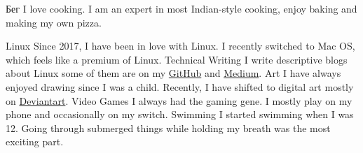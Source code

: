



\begin{cvskills}
  \cvskill
    {Бег} %
    {I love cooking. I am an expert in most Indian-style cooking, enjoy baking and making my own pizza.} %

  \cvskill
    {Linux} %
    {Since 2017, I have been in love with Linux. I recently switched to Mac OS, which feels like a premium of Linux.} %
  \cvskill
    {Technical Writing} %
    {I write descriptive blogs about Linux some of them are on my \href{https://github.com/themagicalmammal/howtodebuntu}{GitHub} and \href{https://medium.com/@d19cyber}{Medium}.} %
  \cvskill
    {Art} %
    {I have always enjoyed drawing since I was a child. Recently, I have shifted to digital art mostly on \href{https://www.deviantart.com/themagicalmammal}{Deviantart}.} %
  \cvskill
    {Video Games} %
    {I always had the gaming gene. I mostly play on my phone and occasionally on my switch.} %
  \cvskill
    {Swimming} %
    {I started swimming when I was 12. Going through submerged things while holding my breath was the most exciting part.} %

\end{cvskills}
